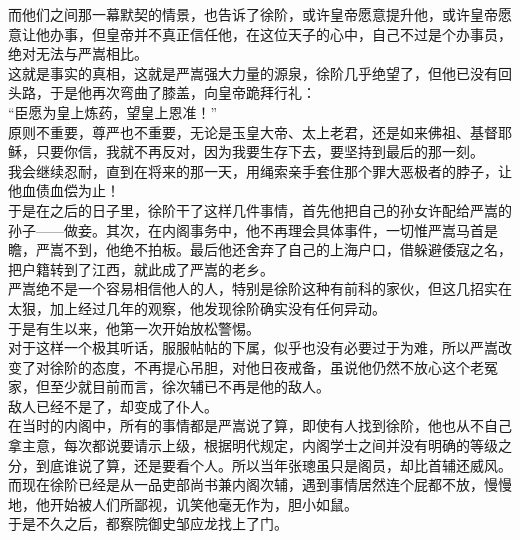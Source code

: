 \begin{multicols}{\theparacolNo}
而他们之间那一幕默契的情景，也告诉了徐阶，或许皇帝愿意提升他，或许皇帝愿意让他办事，但皇帝并不真正信任他，在这位天子的心中，自己不过是个办事员，绝对无法与严嵩相比。\\

这就是事实的真相，这就是严嵩强大力量的源泉，徐阶几乎绝望了，但他已没有回头路，于是他再次弯曲了膝盖，向皇帝跪拜行礼：\\

“臣愿为皇上炼药，望皇上恩准！”\\

原则不重要，尊严也不重要，无论是玉皇大帝、太上老君，还是如来佛祖、基督耶稣，只要你信，我就不再反对，因为我要生存下去，要坚持到最后的那一刻。\\

我会继续忍耐，直到在将来的那一天，用绳索亲手套住那个罪大恶极者的脖子，让他血债血偿为止！\\

于是在之后的日子里，徐阶干了这样几件事情，首先他把自己的孙女许配给严嵩的孙子——做妾。其次，在内阁事务中，他不再理会具体事件，一切惟严嵩马首是瞻，严嵩不到，他绝不拍板。最后他还舍弃了自己的上海户口，借躲避倭寇之名，把户籍转到了江西，就此成了严嵩的老乡。\\

严嵩绝不是一个容易相信他人的人，特别是徐阶这种有前科的家伙，但这几招实在太狠，加上经过几年的观察，他发现徐阶确实没有任何异动。\\

于是有生以来，他第一次开始放松警惕。\\

对于这样一个极其听话，服服帖帖的下属，似乎也没有必要过于为难，所以严嵩改变了对徐阶的态度，不再提心吊胆，对他日夜戒备，虽说他仍然不放心这个老冤家，但至少就目前而言，徐次辅已不再是他的敌人。\\

敌人已经不是了，却变成了仆人。\\

在当时的内阁中，所有的事情都是严嵩说了算，即使有人找到徐阶，他也从不自己拿主意，每次都说要请示上级，根据明代规定，内阁学士之间并没有明确的等级之分，到底谁说了算，还是要看个人。所以当年张璁虽只是阁员，却比首辅还威风。\\

而现在徐阶已经是从一品吏部尚书兼内阁次辅，遇到事情居然连个屁都不放，慢慢地，他开始被人们所鄙视，讥笑他毫无作为，胆小如鼠。\\

于是不久之后，都察院御史邹应龙找上了门。\\


\end{multicols}
